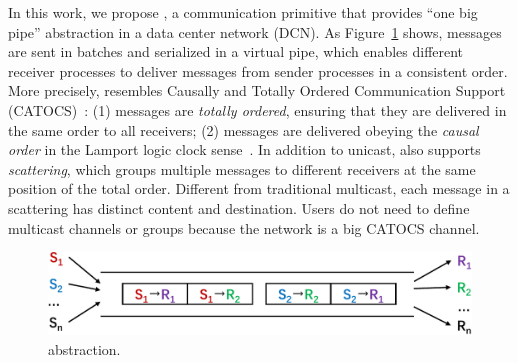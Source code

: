 



In this work, we propose \sys{}, a communication primitive that provides ``one big pipe'' abstraction in a data center network (DCN). As Figure~\ref{fig:1pipe} shows, messages are sent in batches and serialized in a virtual pipe, which enables different receiver processes to deliver messages from sender processes in a consistent order.
More precisely, \sys{} resembles Causally and Totally Ordered Communication Support (CATOCS)~\cite{cheriton1994understanding}: (1) messages are \emph{totally ordered}, ensuring that they are delivered in the same order to all receivers; (2) messages are delivered obeying the \emph{causal order} in the Lamport logic clock sense~\cite{lamport1978time}. In addition to unicast, \sys{} also supports \emph{scattering}, which groups multiple messages to different receivers at the same position of the total order. Different from traditional multicast, each message in a scattering has distinct content and destination. Users do not need to define multicast channels or groups because the network is a big CATOCS channel.


\begin{figure}[t]
	\centering
	\includegraphics[width=.45\textwidth]{images/1pipe.pdf}
	\caption{\sys{} abstraction.}
	\label{fig:1pipe}
\end{figure}


